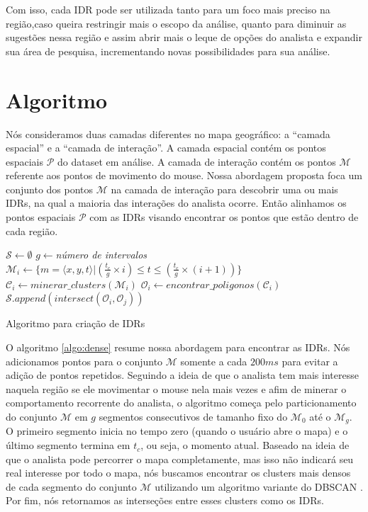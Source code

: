 Com isso, cada IDR pode ser utilizada tanto para um foco mais preciso na região,caso queira restringir mais o escopo da análise, quanto para diminuir as sugestões nessa região e assim abrir mais o leque de opções do analista e expandir sua área de pesquisa, incrementando novas possibilidades para sua análise.

\section{Algoritmo}

Nós consideramos duas camadas diferentes no mapa geográfico: a ``camada espacial'' e a ``camada de interação''. A camada espacial contém os pontos espaciais $\mathcal{P}$ do dataset em análise. A camada de interação  contém os pontos $\mathcal{M}$ referente aos pontos de movimento do mouse. Nossa abordagem proposta foca um conjunto dos pontos $\mathcal{M}$ na camada de interação para descobrir uma ou mais IDRs, na qual a maioria das interações do analista ocorre. Então alinhamos os pontos espaciais $\mathcal{P}$ com as IDRs visando encontrar os pontos que estão dentro de cada região. 

\begin{algorithm}[!h]
        \DontPrintSemicolon
        $\mathcal{S} \gets \emptyset$\;
        $g \gets ${\em número de intervalos}\;
        {
               $\mathcal{M}_i \gets \{m = \langle x,y,t \rangle | (\frac{t_c}{g} \times i) \leq t \leq (\frac{t_c}{g} \times (i+1))\}$\;
               $\mathcal{C}_i \gets \mathit{minerar\_clusters}(\mathcal{M}_i)$\label{ln:mine}\;
               $\mathcal{O}_i \gets \mathit{encontrar\_poligonos}(\mathcal{C}_i)$\label{ln:poly}\;
        }
        {
            $\mathcal{S}.\mathit{append}(\mathit{intersect}(\mathcal{O}_i, \mathcal{O}_j))$
        }
        \;  
        \caption{Algoritmo para criação de IDRs}
        \label{algo:dense}
\end{algorithm}

O algoritmo \ref{algo:dense} resume nossa abordagem para encontrar as IDRs. Nós adicionamos pontos para o conjunto $\mathcal{M}$ somente a cada $200ms$ para evitar a adição de pontos repetidos. Seguindo a ideia de que o analista tem mais interesse naquela região se ele movimentar o mouse nela mais vezes e afim de minerar o comportamento recorrente do analista, o algoritmo começa pelo particionamento do conjunto $\mathcal{M}$ em $g$ segmentos consecutivos de tamanho fixo do $\mathcal{M}_0$ até o $\mathcal{M}_g$. O primeiro segmento inicia no tempo zero (quando o usuário abre o mapa) e o último segmento termina em $t_c$, ou seja, o momento atual. Baseado na ideia de que o analista pode percorrer o mapa completamente, mas isso não indicará seu real interesse por todo o mapa, nós buscamos encontrar os clusters mais densos de cada segmento do conjunto $\mathcal{M}$ utilizando um algoritmo variante do DBSCAN \cite{Ester:1996:DAD:3001460.3001507}. Por fim, nós retornamos as interseções entre esses clusters como os IDRs.

